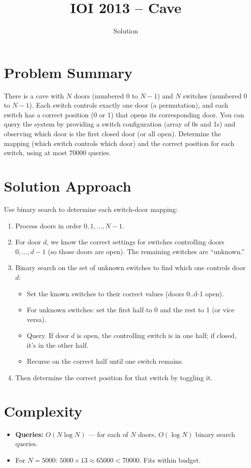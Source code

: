 \documentclass[11pt,a4paper]{article}
\title{IOI 2013 -- Cave}
\author{Solution}
\date{}
\begin{document}
\maketitle

\section{Problem Summary}
There is a cave with $N$ doors (numbered $0$ to $N-1$) and $N$ switches (numbered $0$ to $N-1$). Each switch controls exactly one door (a permutation), and each switch has a correct position (0 or 1) that opens its corresponding door. You can query the system by providing a switch configuration (array of 0s and 1s) and observing which door is the first closed door (or all open). Determine the mapping (which switch controls which door) and the correct position for each switch, using at most $70000$ queries.

\section{Solution Approach}
Use binary search to determine each switch-door mapping:

\begin{enumerate}
    \item Process doors in order $0, 1, \ldots, N-1$.
    \item For door $d$, we know the correct settings for switches controlling doors $0, \ldots, d-1$ (so those doors are open). The remaining switches are ``unknown.''
    \item Binary search on the set of unknown switches to find which one controls door $d$:
    \begin{itemize}
        \item Set the known switches to their correct values (doors 0..d-1 open).
        \item For unknown switches: set the first half to 0 and the rest to 1 (or vice versa).
        \item Query. If door $d$ is open, the controlling switch is in one half; if closed, it's in the other half.
        \item Recurse on the correct half until one switch remains.
    \end{itemize}
    \item Then determine the correct position for that switch by toggling it.
\end{enumerate}

\section{Complexity}
\begin{itemize}
    \item \textbf{Queries:} $O(N \log N)$ --- for each of $N$ doors, $O(\log N)$ binary search queries.
    \item For $N = 5000$: $5000 \times 13 \approx 65000 < 70000$. Fits within budget.
\end{itemize}
\end{document}
